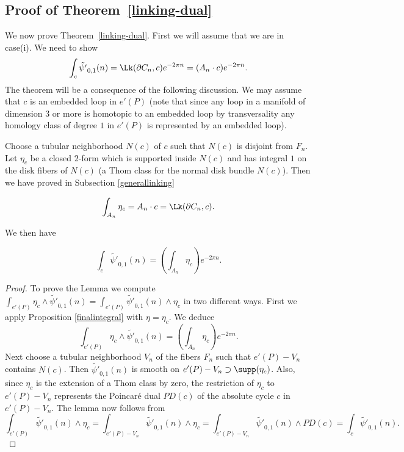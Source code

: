 \subsection{Proof of Theorem~\ref{linking-dual}}\label{W-currents}

We now prove Theorem~\ref{linking-dual}. First we will assume that we are in case(i). We need to show  
\[
\int_c  \tilde{\psi'}_{0,1}(n) = \Lk(\partial C_n,c) e^{-2\pi n} =  (A_n \cdot c) e^{-2\pi n}.
\]
The theorem will be a consequence of the following discussion.  
We may assume that $c$ is an embedded loop in $e'(P)$ (note that
since any loop in a manifold of dimension $3$ or more is homotopic
to an embedded loop by transversality any homology class of degree
$1$ in $e'(P)$ is represented by an embedded loop).

Choose a tubular neighborhood $N(c)$ of $c$ such that $N(c)$ is
disjoint from $F_n$. Let $\eta_c$ be a closed $2$-form which is
supported inside $N(c)$ and has integral $1$ on the disk fibers of
$N(c)$ (a Thom class for the normal disk bundle $N(c)$).
Then we have proved in Subsection \ref{generallinking}  

\begin{lemma}\label{integrallink}
\begin{equation} \label{secondformula}
\int_{A_n} \eta_c= A_n \cdot  c= \Lk(\partial C_n, c).
\end{equation}
\end{lemma}


We then have

\begin{lemma} \label{laststep}
\begin{equation*} \label{fifthformula}
\int_c \tilde{\psi'}_{0,1}(n) = \left(\int_{A_n} \eta_c\right) e^{- 2\pi n}.
\end{equation*}
\end{lemma}

\begin{proof}
To prove the Lemma we compute $\int_{e'(P)} \eta_c \wedge  \tilde{\psi'}_{0,1}(n)= \int_{e'(P)} \tilde{\psi'}_{0,1}(n) \wedge \eta_c$ in two different ways. First we apply Proposition \ref{finalintegral} with $\eta = \eta_c$.  We deduce
\begin{equation*}\label{thirdformula}
\int_{e'(P)}\eta_c \wedge \tilde{\psi'}_{0,1}(n) = \left(\int_{A_n} \eta_c\right) e^{-2 \pi n}.
\end{equation*}
Next choose a tubular neighborhood $V_n$ of the fibers $F_n$   such that $e'(P) - V_n$
contains $N(c)$.  Then $\tilde{\psi'}_{0,1}(n)$ is smooth on $e'(P)
- V_n \supset \supp (\eta_c)$.  Also, since $\eta_c$ is the extension
of a Thom class by zero,  the restriction of  $\eta_c$ to $e'(P) -
V_n$ represents the Poincar\'e dual $PD(c)$ of the absolute cycle
$c$ in
$e'(P) -V_n$. The lemma now follows from 
\begin{equation*}
\int_{e'(P)} \tilde{\psi'}_{0,1}(n) \wedge \eta_c   = \int_{e'(P)- V_n} \tilde{\psi'}_{0,1}(n) \wedge \eta_c = \int_{e'(P)- V_n} \tilde{\psi'}_{0,1}(n) \wedge PD(c)
  = \int_{c} \tilde{\psi'}_{0,1}(n). 
\end{equation*}
\end{proof}

